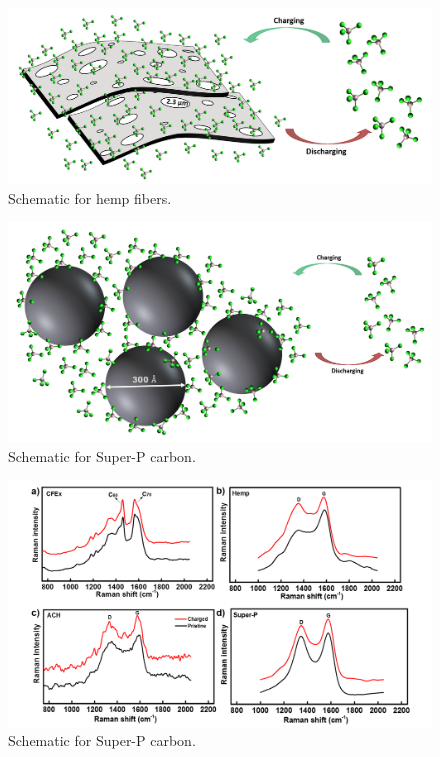 \documentclass{article}
\begin{document}
\begin{figure}[h]
  \centering
  \includegraphics[width=\textwidth]{figures/fig4}
    \caption{Schematic for hemp fibers.}
  \label{figures:fig1}
\end{figure}
\begin{figure}[h]
  \centering
  \includegraphics[width=\textwidth]{figures/fig5}
    \caption{Schematic for Super-P carbon.}
  \label{figures:fig1}
\end{figure}
\begin{figure}[h]
  \centering
  \includegraphics[width=\textwidth]{figures/Raman}
    \caption{Schematic for Super-P carbon.}
  \label{figures:fig1}
\end{figure}
\end{document}
